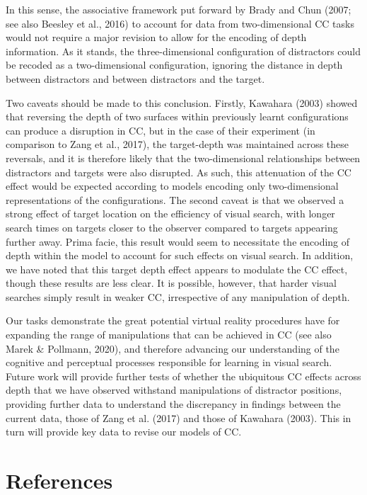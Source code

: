\documentclass[
  english,
  man,floatsintext]{apa7}
\begin{document}
In this sense, the associative framework put forward by Brady and Chun (2007; see also Beesley et al., 2016) to account for data from two-dimensional CC tasks would not require a major revision to allow for the encoding of depth information. As it stands, the three-dimensional configuration of distractors could be recoded as a two-dimensional configuration, ignoring the distance in depth between distractors and between distractors and the target.

Two caveats should be made to this conclusion. Firstly, Kawahara (2003) showed that reversing the depth of two surfaces within previously learnt configurations can produce a disruption in CC, but in the case of their experiment (in comparison to Zang et al., 2017), the target-depth was maintained across these reversals, and it is therefore likely that the two-dimensional relationships between distractors and targets were also disrupted. As such, this attenuation of the CC effect would be expected according to models encoding only two-dimensional representations of the configurations. The second caveat is that we observed a strong effect of target location on the efficiency of visual search, with longer search times on targets closer to the observer compared to targets appearing further away. Prima facie, this result would seem to necessitate the encoding of depth within the model to account for such effects on visual search. In addition, we have noted that this target depth effect appears to modulate the CC effect, though these results are less clear. It is possible, however, that harder visual searches simply result in weaker CC, irrespective of any manipulation of depth.

Our tasks demonstrate the great potential virtual reality procedures have for expanding the range of manipulations that can be achieved in CC (see also Marek \& Pollmann, 2020), and therefore advancing our understanding of the cognitive and perceptual processes responsible for learning in visual search. Future work will provide further tests of whether the ubiquitous CC effects across depth that we have observed withstand manipulations of distractor positions, providing further data to understand the discrepancy in findings between the current data, those of Zang et al. (2017) and those of Kawahara (2003). This in turn will provide key data to revise our models of CC.

\newpage

\hypertarget{references}{%
\section*{References}\label{references}}
\end{document}
